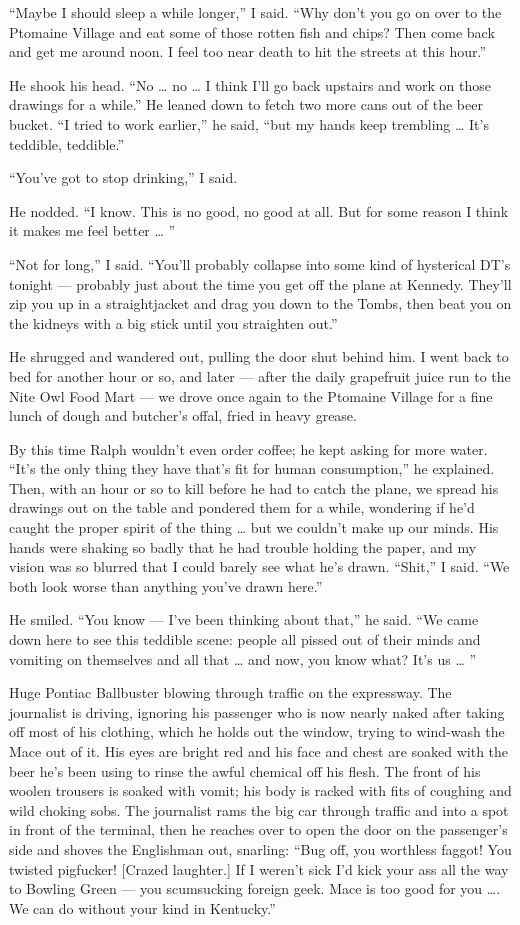 \documentclass[10pt,a4paper]{article}
\begin{document}
“Maybe I should sleep a while longer,” I said. “Why don’t you go on over to the Ptomaine Village and eat some of those rotten fish and chips? Then come back and get me around noon. I feel too near death to hit the streets at this hour.”

He shook his head. “No … no … I think I’ll go back upstairs and work on those drawings for a while.” He leaned down to fetch two more cans out of the beer bucket. “I tried to work earlier,” he said, “but my hands keep trembling … It’s teddible, teddible.”

“You’ve got to stop drinking,” I said.

He nodded. “I know. This is no good, no good at all. But for some reason I think it makes me feel better … ”

“Not for long,” I said. “You’ll probably collapse into some kind of hysterical DT’s tonight — probably just about the time you get off the plane at Kennedy. They’ll zip you up in a straightjacket and drag you down to the Tombs, then beat you on the kidneys with a big stick until you straighten out.”

He shrugged and wandered out, pulling the door shut behind him. I went back to bed for another hour or so, and later — after the daily grapefruit juice run to the Nite Owl Food Mart — we drove once again to the Ptomaine Village for a fine lunch of dough and butcher’s offal, fried in heavy grease.

By this time Ralph wouldn’t even order coffee; he kept asking for more water. “It’s the only thing they have that’s fit for human consumption,” he explained. Then, with an hour or so to kill before he had to catch the plane, we spread his drawings out on the table and pondered them for a while, wondering if he’d caught the proper spirit of the thing … but we couldn’t make up our minds. His hands were shaking so badly that he had trouble holding the paper, and my vision was so blurred that I could barely see what he’s drawn. “Shit,” I said. “We both look worse than anything you’ve drawn here.”

He smiled. “You know — I’ve been thinking about that,” he said. “We came down here to see this teddible scene: people all pissed out of their minds and vomiting on themselves and all that … and now, you know what? It’s us … ”

Huge Pontiac Ballbuster blowing through traffic on the expressway. The journalist is driving, ignoring his passenger who is now nearly naked after taking off most of his clothing, which he holds out the window, trying to wind-wash the Mace out of it. His eyes are bright red and his face and chest are soaked with the beer he’s been using to rinse the awful chemical off his flesh. The front of his woolen trousers is soaked with vomit; his body is racked with fits of coughing and wild choking sobs. The journalist rams the big car through traffic and into a spot in front of the terminal, then he reaches over to open the door on the passenger’s side and shoves the Englishman out, snarling: “Bug off, you worthless faggot! You twisted pigfucker! [Crazed laughter.] If I weren’t sick I’d kick your ass all the way to Bowling Green — you scumsucking foreign geek. Mace is too good for you …. We can do without your kind in Kentucky.”
\end{document}
